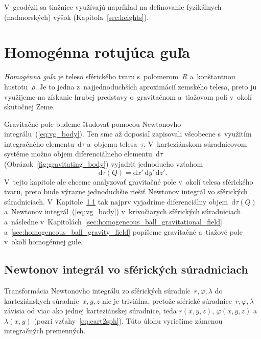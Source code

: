 \documentclass[a4paper, 12pt]{book}
\newcommand{\diff}{\mathrm d}
\begin{document}
V~geodézii sa tiažnice využívajú napríklad na definovanie fyzikálnych 
(nadmorských) výšok (Kapitola~\ref{sec:heights}).

\section{Homogénna rotujúca guľa}
\label{sec:homogeneous_ball}

\emph{Homogénna guľa} je teleso sférického tvaru s~polomerom~$R$ a~konštantnou 
hustotu~$\rho$.  Je to jedna z~najjednoduchších aproximácií zemského telesa, 
preto ju využijeme na získanie hrubej predstavy o~gravitačnom a~tiažovom poli 
v~okolí skutočnej Zeme.

Gravitačné pole budeme študovať pomocou Newtonovho 
integrálu~(\ref{eq:vg_body}).  Ten sme až doposiaľ zapisovali všeobecne 
s~využitím integračného elementu~$\diff \tau$ a~objemu telesa~$\tau$.  
V~karteziánskom súradnicovom systéme možno objem diferenciálneho 
elementu~$\diff \tau$ (Obrázok~\ref{fig:gravitating_body}) vyjadriť jednoducho 
vzťahom
%
\begin{equation}
\label{eq:dtau_cart}
\diff \tau(Q) = \diff x' \, \diff y' \, \diff z'{.}
\end{equation}
% 
V~tejto kapitole ale chceme analyzovať gravitačné pole v~okolí telesa 
sférického tvaru, preto bude výrazne jednoduchšie riešiť Newtonov integrál vo 
sférických súradniciach.  
V~Kapitole~\ref{sec:newton_integral_in_spherical_coordinates} tak najprv 
vyjadríme diferenciálny objem~$\diff \tau(Q)$ a~Newtonov 
integrál~(\ref{eq:vg_body}) v~krivočiarych sférických súradniciach a~následne 
v~Kapitolách~\ref{sec:homogeneous_ball_gravitational_field} 
a~\ref{sec:homogeneous_ball_gravity_field} popíšeme gravitačné a~tiažové pole 
v~okolí homogénnej gule.

\subsection{Newtonov integrál vo sférických súradniciach}
\label{sec:newton_integral_in_spherical_coordinates}

Transformácia Newtonovho integrálu zo sférických súradníc~$r, \varphi, \lambda$ 
do karteziánskych súradníc~$x, y, z$ nie je triviálna, pretože sférické 
súradnice~$r, \varphi, \lambda$ závisia od viac ako jednej karteziánskej 
súradnice, teda $r(x, y, z)$, $\varphi(x, y, z)$ a~$\lambda(x, y)$ (pozri 
vzťahy~\ref{eq:cart2sph}).  Túto úlohu vyriešime zámenou integračných 
premenných.
\end{document}
